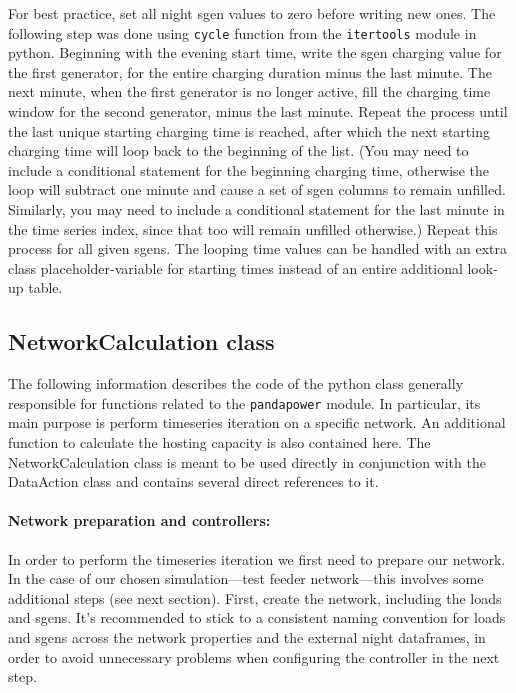 \documentclass[a4paper,10pt]{report}
\begin{document}
For best practice, set all night sgen values to zero before writing new ones. The following step was done using \texttt{cycle} function from the \texttt{itertools} module in python. Beginning with the evening start time, write the sgen charging value for the first generator, for the entire charging duration minus the last minute. The next minute, when the first generator is no longer active, fill the charging time window for the second generator, minus the last minute. Repeat the process until the last unique starting charging time is reached, after which the next starting charging time will loop back to the beginning of the list. (You may need to include a conditional statement for the beginning charging time, otherwise the loop will subtract one minute and cause a set of sgen columns to remain unfilled. Similarly, you may need to include a conditional statement for the last minute in the time series index, since that too will remain unfilled otherwise.) Repeat this process for all given sgens. The looping time values can be handled with an extra class placeholder-variable for starting times instead of an entire additional look-up table.


\subsection{NetworkCalculation class}
The following information describes the code of the python class generally responsible for functions related to the \texttt{pandapower} module. In particular, its main purpose is perform timeseries iteration on a specific network. An additional function to calculate the hosting capacity is also contained here. The NetworkCalculation class is meant to be used directly in conjunction with the DataAction class and contains several direct references to it.

\paragraph{Network preparation and controllers:} In order to perform the timeseries iteration we first need to prepare our network. In the case of our chosen simulation---test feeder network---this involves some additional steps (see next section). First, create the network, including the loads and sgens. It's recommended to stick to a consistent naming convention for loads and sgens across the network properties and the external night dataframes, in order to avoid unnecessary problems when configuring the controller in the next step.
\end{document}
